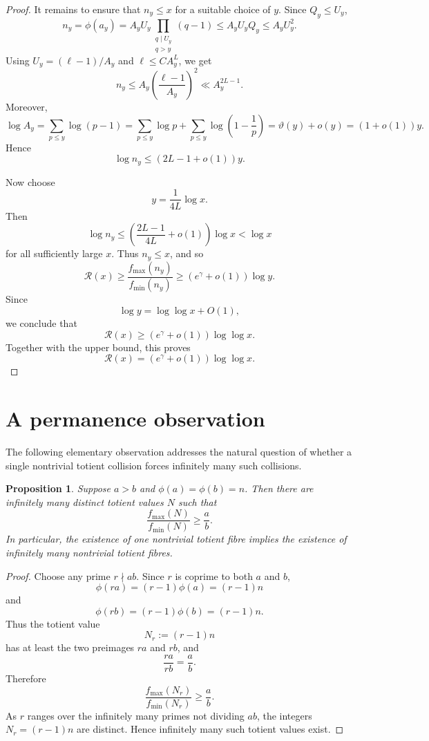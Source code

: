 \documentclass[11pt,a4paper]{amsart}
\newtheorem{proposition}[theorem]{Proposition}
\begin{document}
\begin{proof}
It remains to ensure that \(n_y\le x\) for a suitable choice of \(y\). Since \(Q_y\le U_y\),
\[
n_y
=
\phi(a_y)
=
A_yU_y
\prod_{\substack{q\mid U_y\\ q>y}}(q-1)
\le
A_yU_yQ_y
\le
A_yU_y^2.
\]
Using \(U_y=(\ell-1)/A_y\) and \(\ell\le C A_y^L\), we get
\[
n_y
\le
A_y\left(\frac{\ell-1}{A_y}\right)^2
\ll
A_y^{2L-1}.
\]
Moreover,
\[
\log A_y
=
\sum_{p\le y}\log(p-1)
=
\sum_{p\le y}\log p+\sum_{p\le y}\log\left(1-\frac1p\right)
=
\vartheta(y)+o(y)
=
(1+o(1))y.
\]
Hence
\[
\log n_y
\le
(2L-1+o(1))y.
\]

Now choose
\[
y=\frac{1}{4L}\log x.
\]
Then
\[
\log n_y
\le
\left(\frac{2L-1}{4L}+o(1)\right)\log x
<
\log x
\]
for all sufficiently large \(x\). Thus \(n_y\le x\), and so
\[
\mathcal R(x)
\ge
\frac{f_{\max}(n_y)}{f_{\min}(n_y)}
\ge
(e^\gamma+o(1))\log y.
\]
Since
\[
\log y
=
\log\log x+O(1),
\]
we conclude that
\[
\mathcal R(x)
\ge
(e^\gamma+o(1))\log\log x.
\]
Together with the upper bound, this proves
\[
\mathcal R(x)
=
(e^\gamma+o(1))\log\log x.
\]
\end{proof}

\section{A permanence observation}

The following elementary observation addresses the natural question of whether a single nontrivial totient collision forces infinitely many such collisions.

\begin{proposition}
Suppose \(a>b\) and \(\phi(a)=\phi(b)=n\). Then there are infinitely many distinct totient values \(N\) such that
\[
\frac{f_{\max}(N)}{f_{\min}(N)}\ge \frac ab.
\]
In particular, the existence of one nontrivial totient fibre implies the existence of infinitely many nontrivial totient fibres.
\end{proposition}

\begin{proof}
Choose any prime \(r\nmid ab\). Since \(r\) is coprime to both \(a\) and \(b\),
\[
\phi(ra)=(r-1)\phi(a)=(r-1)n
\]
and
\[
\phi(rb)=(r-1)\phi(b)=(r-1)n.
\]
Thus the totient value
\[
N_r:=(r-1)n
\]
has at least the two preimages \(ra\) and \(rb\), and
\[
\frac{ra}{rb}=\frac ab.
\]
Therefore
\[
\frac{f_{\max}(N_r)}{f_{\min}(N_r)}
\ge
\frac ab.
\]
As \(r\) ranges over the infinitely many primes not dividing \(ab\), the integers \(N_r=(r-1)n\) are distinct. Hence infinitely many such totient values exist.
\end{proof}
\end{document}
